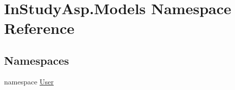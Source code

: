 \hypertarget{namespace_in_study_asp_1_1_models}{}\section{In\+Study\+Asp.\+Models Namespace Reference}
\label{namespace_in_study_asp_1_1_models}
\subsection*{Namespaces}
\begin{DoxyCompactItemize}
\item 
namespace \hyperlink{namespace_in_study_asp_1_1_models_1_1_user}{User}
\end{DoxyCompactItemize}
